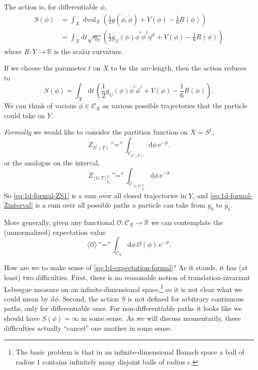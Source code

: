 \documentclass[12pt,letterpaper,reqno]{article}
\numberwithin{equation}{section}
\newcommand{\cC}{\ensuremath{\mathcal C}}
\newcommand{\cO}{\ensuremath{\mathcal O}}
\newcommand{\R}{\ensuremath{\mathbb R}}
\newcommand{\half}{\ensuremath{\frac{1}{2}}}
\newcommand{\e}{{\mathrm e}}
\newcommand{\de}{\mathrm{d}}
\newcommand{\IP}[1]{\langle#1\rangle}
\newcommand{\eps}{\epsilon}
\newcommand{\ti}[1]{\textit{#1}}
\DeclareMathOperator{\dvol}{dvol}
\newcommand{\insfig}[2]{

\medskip
\noindent
\begin{minipage}{\linewidth}
\makebox[\linewidth]{\texttt{[image: figures/\#1-crop.pdf]}}
\end{minipage}
\noindent}
\begin{document}
The action is, for differentiable $\phi$,
\begin{align} \label{eq:1d-sigma-model-action}
  S(\phi) &= \int_X \dvol_X \left(\half g(\dot\phi,\dot\phi) + V(\phi) - \frac16 R(\phi) \right) \\
  &= \int_X \de t \sqrt{\eta_{tt}} \left(\half g_{ij}(\phi) \dot\phi^i \dot\phi^j \eta^{tt} + V(\phi) - \frac16 R(\phi)\right)
\end{align}
where $R: Y \to \R$ is the scalar curvature.

If we choose the parameter $t$ on $X$ to be the arc-length, then
the action reduces to
\begin{equation}
    S(\phi) = \int_X \de t \, \left( \half g_{ij}(\phi) \dot\phi^i \dot\phi^j + V(\phi) - \frac16 R(\phi) \right).
\end{equation}
We can think of various $\phi \in \cC_X$ as various possible
trajectories that the particle could take on $Y$.

\ti{Formally} we would like to consider the partition function on $X = S^1$,
\begin{equation} \label{eq:1d-formal-ZS1}
  Z_{S^1(T)} \, \text{''=''} \, \int_{\cC_{S^1(T)}} \de \phi \, \e^{-S}.
\end{equation}
or the analogue on the interval,
\begin{equation} \label{eq:1d-formal-Zinterval}
  Z_{[0,T]_{y_0}^{y_1}} \, \text{''=''} \, \int_{\cC_{[0,T]_{y_0}^{y_1}}} \de \phi \, \e^{-S}
\end{equation}
So \eqref{eq:1d-formal-ZS1} is a sum over all
closed trajectories in $Y$, and \eqref{eq:1d-formal-Zinterval} 
is a sum over all possible paths
a particle can take from $y_0$ to $y_1$.
\insfig{qft-geometry-16}{0.8}
More generally, given any functional $\cO: \cC_X \to \R$
we can contemplate the (unnormalized) expectation value
\begin{equation} \label{eq:1d-expectation-formal}
  \IP{\cO} \, \text{''=''} \, \int_{\cC_{X}} \de \phi \, \cO(\phi) \, \e^{-S}.
\end{equation}

How are we to make sense of \eqref{eq:1d-expectation-formal}?
As it stands, it has (at least) two difficulties.
First, there is no reasonable notion of translation-invariant Lebesgue measure on 
an infinite-dimensional space,\footnote{The basic problem is that in an 
infinite-dimensional Banach space a ball of radius $1$
contains infinitely many disjoint balls of radius $\eps$.} 
so it is not clear what we could mean by
$\de \phi$. Second, the action $S$ is not defined for arbitrary continuous
paths, only for differentiable ones. For non-differentiable paths it looks
like we should have $S(\phi) = \infty$ in some sense.
As we will discuss momentarily,  
these difficulties actually ``cancel'' one another
in some sense.
\end{document}
